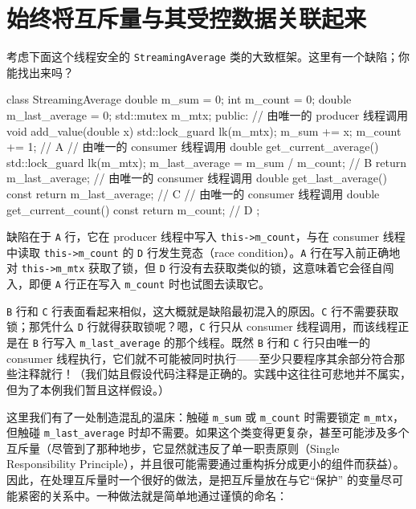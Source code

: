 \section{始终将互斥量与其受控数据关联起来}

考虑下面这个线程安全的 \texttt{Streaming\allowbreak{}Average} 类的大致框架。这里有一个缺陷；你能找出来吗？

\begin{codebox}[cpp]
    class StreamingAverage {
      double m_sum = 0;
      int m_count = 0;
      double m_last_average = 0;
      std::mutex m_mtx;
    public:
      // 由唯一的 producer 线程调用
      void add_value(double x) {
        std::lock_guard lk(m_mtx);
        m_sum += x;
        m_count += 1; // A
      }
      // 由唯一的 consumer 线程调用
      double get_current_average() {
        std::lock_guard lk(m_mtx);
        m_last_average = m_sum / m_count; // B
        return m_last_average;
      }
      // 由唯一的 consumer 线程调用
      double get_last_average() const {
        return m_last_average; // C
      }
      // 由唯一的 consumer 线程调用
      double get_current_count() const {
        return m_count; // D
      }
    };
\end{codebox}

缺陷在于 \texttt{A} 行，它在 producer 线程中写入 \texttt{this->m\_\allowbreak{}count}，与在 consumer 线程中读取 \texttt{this->m\_\allowbreak{}count} 的 \texttt{D} 行发生竞态（race condition）。\texttt{A} 行在写入前正确地对 \texttt{this->m\_\allowbreak{}mtx} 获取了锁，但 \texttt{D} 行没有去获取类似的锁，这意味着它会径自闯入，即便 \texttt{A} 行正在写入 \texttt{m\_\allowbreak{}count} 时也试图去读取它。

\texttt{B} 行和 \texttt{C} 行表面看起来相似，这大概就是缺陷最初混入的原因。\texttt{C} 行不需要获取锁；那凭什么 \texttt{D} 行就得获取锁呢？嗯，\texttt{C} 行只从 consumer 线程调用，而该线程正是在 \texttt{B} 行写入 \texttt{m\_\allowbreak{}last\_\allowbreak{}average} 的那个线程。既然 \texttt{B} 行和 \texttt{C} 行只由唯一的 consumer 线程执行，它们就不可能被同时执行——至少只要程序其余部分符合那些注释就行！（我们姑且假设代码注释是正确的。实践中这往往可悲地并不属实，但为了本例我们暂且这样假设。）

这里我们有了一处制造混乱的温床：触碰 \texttt{m\_\allowbreak{}sum} 或 \texttt{m\_\allowbreak{}count} 时需要锁定 \texttt{m\_\allowbreak{}mtx}，但触碰 \texttt{m\_\allowbreak{}last\_\allowbreak{}average} 时却不需要。如果这个类变得更复杂，甚至可能涉及多个互斥量（尽管到了那种地步，它显然就违反了单一职责原则（Single Responsibility Principle），并且很可能需要通过重构拆分成更小的组件而获益）。因此，在处理互斥量时一个很好的做法，是把互斥量放在与它“保护” 的变量尽可能紧密的关系中。一种做法就是简单地通过谨慎的命名：

